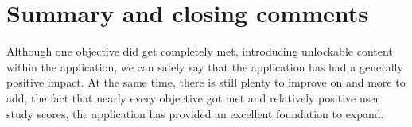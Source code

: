 


	
	
	
	
	
		
	



	\section{Summary and closing comments}
	
	Although one objective did get completely met, introducing unlockable content within the application, we can safely say that the application has had a generally positive impact. At the same time, there is still plenty to improve on and more to add, the fact that nearly every objective got met and relatively positive user study scores, the application has provided an excellent foundation to expand. 
	

